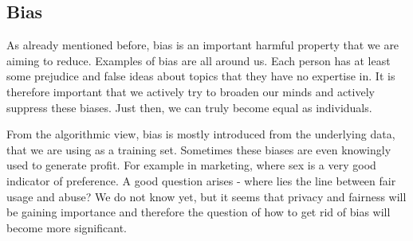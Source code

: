 
\subsection{Bias}
As already mentioned before, bias is an important harmful property that we are aiming to reduce. Examples of bias are all around us. Each person has at least some prejudice and false ideas about topics that they have no expertise in. It is therefore important that we actively try to broaden our minds and actively suppress these biases. Just then, we can truly become equal as individuals.

From the algorithmic view, bias is mostly introduced from the underlying data, that we are using as a training set. Sometimes these biases are even knowingly used to generate profit. For example in marketing, where sex is a very good indicator of preference. A good question arises - where lies the line between fair usage and abuse? We do not know yet, but it seems that privacy and fairness will be gaining importance and therefore the question of how to get rid of bias will become more significant.



